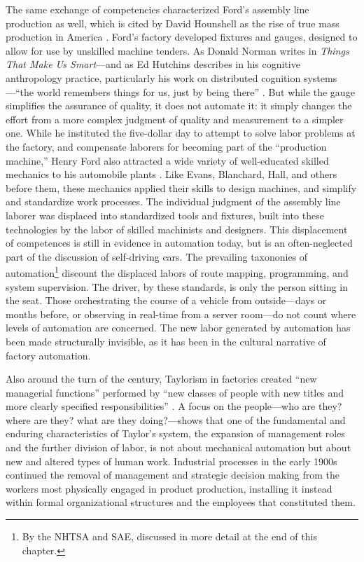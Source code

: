 The same exchange of competencies characterized Ford's assembly line
production as well, which is cited by David Hounshell as the rise of
true mass production in America \cite[p. 217]{hounshell}. Ford's factory developed fixtures
and gauges, designed to allow for use by unskilled machine tenders. As Donald
Norman writes in \emph{Things That Make Us Smart}---and as Ed
Hutchins describes in his cognitive anthropology practice,
particularly his work
on distributed cognition
systems \cite{hutchinsCockpit}---``the world remembers things for us, just by being
there'' \cite[p. 147]{normanThings}. But while the gauge simplifies the
assurance  of quality, it does not
automate it:  it simply changes the effort from a more complex judgment
of quality and measurement to a simpler one. While he instituted the
five-dollar day to attempt to solve labor problems at the factory, and
compensate laborers for becoming part of the ``production machine,''
Henry Ford also attracted a wide variety of well-educated skilled mechanics
to his automobile plants \cite[p. 223]{hounshell}. Like Evans, Blanchard, Hall, and others
before them, these mechanics applied their skills to design machines,
and simplify and standardize work processes. The individual judgment
of the assembly line laborer was displaced into standardized tools and
fixtures, built into these technologies by the labor of skilled
machinists and designers. This displacement of competences is still in
evidence in automation today, but is an often-neglected part of the
discussion of self-driving cars. The prevailing taxononies of
automation\footnote{By the NHTSA and SAE, discussed in more detail at
  the end of this chapter.} discount the displaced labors of route
mapping, programming, and system supervision. The driver, by these
standards, is only the person sitting in the seat. Those orchestrating
the course of a vehicle from outside---days or months before, or
observing in real-time from a server room---do not count where levels of
automation are concerned. The new labor generated by automation has
been made structurally invisible, as it has been in the cultural
narrative of factory automation.

Also around the turn of the century, Taylorism in factories created ``new managerial
functions'' performed by ``new classes of people with new titles and
more clearly specified responsibilities'' \cite[p. 120]{aitken}. A focus on the
people---who are they? where are they? what are they doing?---shows that
one of the fundamental and enduring characteristics of Taylor's
system, the expansion of management roles and the further division of
labor, is not about mechanical automation but about new and altered
types of human work. Industrial processes in the early 1900s continued
the removal of management and strategic decision making from the
workers most physically engaged in product production, installing it
instead within formal organizational structures and the employees that
constituted them. 

